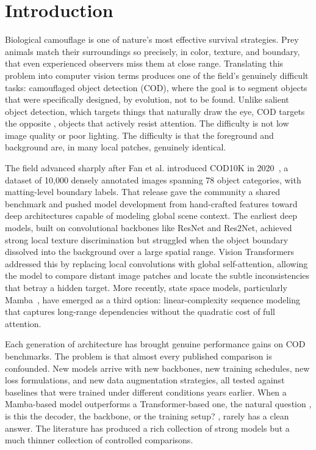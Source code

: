 \documentclass[10pt,conference]{IEEEtran}
\begin{document}
\section{Introduction}

Biological camouflage is one of nature's most effective survival strategies. Prey animals match their surroundings so precisely, in color, texture, and boundary, that even experienced observers miss them at close range. Translating this problem into computer vision terms produces one of the field's genuinely difficult tasks: camouflaged object detection (COD), where the goal is to segment objects that were specifically designed, by evolution, not to be found. Unlike salient object detection, which targets things that naturally draw the eye, COD targets the opposite , objects that actively resist attention. The difficulty is not low image quality or poor lighting. The difficulty is that the foreground and background are, in many local patches, genuinely identical.

The field advanced sharply after Fan et al. introduced COD10K in 2020~\cite{fan2020cod}, a dataset of 10,000 densely annotated images spanning 78 object categories, with matting-level boundary labels. That release gave the community a shared benchmark and pushed model development from hand-crafted features toward deep architectures capable of modeling global scene context. The earliest deep models, built on convolutional backbones like ResNet and Res2Net, achieved strong local texture discrimination but struggled when the object boundary dissolved into the background over a large spatial range. Vision Transformers addressed this by replacing local convolutions with global self-attention, allowing the model to compare distant image patches and locate the subtle inconsistencies that betray a hidden target. More recently, state space models, particularly Mamba~\cite{gu2023mamba}, have emerged as a third option: linear-complexity sequence modeling that captures long-range dependencies without the quadratic cost of full attention.

Each generation of architecture has brought genuine performance gains on COD benchmarks. The problem is that almost every published comparison is confounded. New models arrive with new backbones, new training schedules, new loss formulations, and new data augmentation strategies, all tested against baselines that were trained under different conditions years earlier. When a Mamba-based model outperforms a Transformer-based one, the natural question , is this the decoder, the backbone, or the training setup? , rarely has a clean answer. The literature has produced a rich collection of strong models but a much thinner collection of controlled comparisons.
\end{document}
